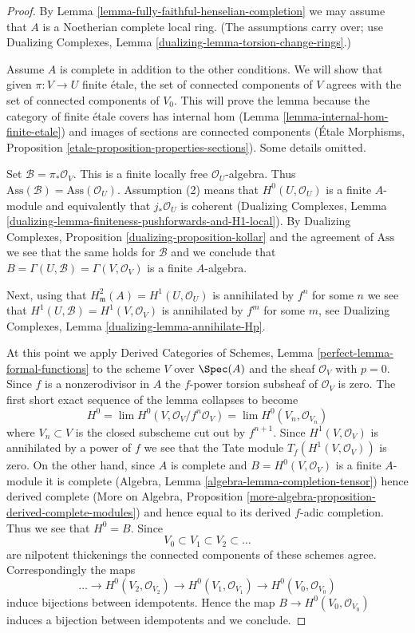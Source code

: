 \begin{proof}
By Lemma \ref{lemma-fully-faithful-henselian-completion}
we may assume that $A$ is a Noetherian complete local ring.
(The assumptions carry over; use
Dualizing Complexes, Lemma \ref{dualizing-lemma-torsion-change-rings}.)

\medskip\noindent
Assume $A$ is complete in addition to the other conditions.
We will show that given $\pi : V \to U$ finite \'etale, the set
of connected components of $V$ agrees with the set of connected
components of $V_0$. This will prove the lemma because the
category of finite \'etale covers has internal hom
(Lemma \ref{lemma-internal-hom-finite-etale})
and images of sections are connected components
(\'Etale Morphisms, Proposition \ref{etale-proposition-properties-sections}).
Some details omitted.

\medskip\noindent
Set $\mathcal{B} = \pi_*\mathcal{O}_V$. This is a finite locally free
$\mathcal{O}_U$-algebra. Thus
$\text{Ass}(\mathcal{B}) = \text{Ass}(\mathcal{O}_U)$.
Assumption (2) means that $H^0(U, \mathcal{O}_U)$ is a finite
$A$-module and equivalently that $j_*\mathcal{O}_U$ is coherent
(Dualizing Complexes, Lemma
\ref{dualizing-lemma-finiteness-pushforwards-and-H1-local}).
By Dualizing Complexes, Proposition \ref{dualizing-proposition-kollar}
and the agreement of $\text{Ass}$
we see that the same holds for $\mathcal{B}$ and we conclude
that $B = \Gamma(U, \mathcal{B}) = \Gamma(V, \mathcal{O}_V)$
is a finite $A$-algebra.

\medskip\noindent
Next, using that $H^2_\mathfrak m(A) = H^1(U, \mathcal{O}_U)$
is annihilated by $f^n$ for some $n$ we see that
$H^1(U, \mathcal{B}) = H^1(V, \mathcal{O}_V)$
is annihilated by $f^m$ for some $m$, see
Dualizing Complexes, Lemma \ref{dualizing-lemma-annihilate-Hp}.

\medskip\noindent
At this point we apply Derived Categories of Schemes, Lemma
\ref{perfect-lemma-formal-functions} to
the scheme $V$ over $\Spec(A)$ and the sheaf $\mathcal{O}_V$
with $p = 0$. Since $f$ is a nonzerodivisor in $A$ the $f$-power torsion
subsheaf of $\mathcal{O}_V$ is zero. The first short exact sequence
of the lemma collapses to become
$$
H^0 = \lim H^0(V, \mathcal{O}_V/f^n\mathcal{O}_V) =
\lim H^0(V_n, \mathcal{O}_{V_n})
$$
where $V_n \subset V$ is the closed subscheme cut out by $f^{n + 1}$.
Since $H^1(V, \mathcal{O}_V)$ is annihilated by a power
of $f$ we see that the Tate module $T_f(H^1(V, \mathcal{O}_V))$ is zero.
On the other hand, since $A$ is complete and
$B = H^0(V, \mathcal{O}_V)$ is a finite $A$-module
it is complete (Algebra, Lemma \ref{algebra-lemma-completion-tensor})
hence derived complete
(More on Algebra,
Proposition \ref{more-algebra-proposition-derived-complete-modules})
and hence equal to its derived $f$-adic completion.
Thus we see that $H^0 = B$.
Since
$$
V_0 \subset V_1 \subset V_2 \subset \ldots
$$
are nilpotent thickenings the connected components of these schemes
agree. Correspondingly the maps
$$
\ldots \to
H^0(V_2, \mathcal{O}_{V_2}) \to
H^0(V_1, \mathcal{O}_{V_1}) \to
H^0(V_0, \mathcal{O}_{V_0})
$$
induce bijections between idempotents. Hence the map
$B \to H^0(V_0, \mathcal{O}_{V_0})$ induces a bijection between
idempotents and we conclude.
\end{proof}

